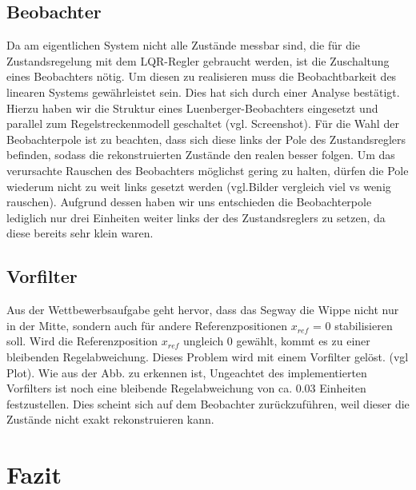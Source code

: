 \documentclass[pdf]{ifacconf}
\begin{document}

	\subsection{Beobachter}
		
	Da am eigentlichen System nicht alle Zustände messbar sind, die für die Zustandsregelung 			mit dem LQR-Regler gebraucht werden, ist die Zuschaltung eines Beobachters nötig.
	Um diesen zu realisieren muss die Beobachtbarkeit des linearen Systems gewährleistet sein.
	Dies hat sich durch einer Analyse bestätigt.
	Hierzu haben wir die Struktur eines Luenberger-Beobachters eingesetzt und parallel zum            	Regelstreckenmodell geschaltet (vgl. Screenshot). Für die Wahl der Beobachterpole ist zu beachten, dass sich diese links der Pole des Zustandsreglers befinden, sodass die rekonstruierten Zustände den realen besser folgen. Um das verursachte Rauschen des Beobachters möglichst gering zu halten, dürfen die Pole wiederum nicht zu weit links gesetzt werden (vgl.Bilder vergleich viel vs wenig rauschen). Aufgrund dessen haben wir uns entschieden die Beobachterpole lediglich nur drei Einheiten weiter links der des Zustandsreglers zu setzen, da diese bereits sehr klein waren. 
	


	\subsection{Vorfilter}
	Aus der Wettbewerbsaufgabe geht hervor, dass das Segway die Wippe nicht nur in der Mitte, sondern auch für andere Referenzpositionen $x^{}_{ref}$ = 0 stabilisieren soll. Wird die Referenzposition $x^{}_{ref}$ ungleich 0 gewählt, kommt es zu einer bleibenden Regelabweichung. Dieses Problem wird mit einem Vorfilter gelöst. (vgl Plot). Wie aus der Abb. zu erkennen ist, 
	Ungeachtet des implementierten Vorfilters ist noch eine bleibende Regelabweichung von ca. 0.03 Einheiten festzustellen. Dies scheint sich auf dem Beobachter zurückzuführen, weil dieser die Zustände nicht exakt rekonstruieren kann.  


\section{Fazit}
\end{document}

